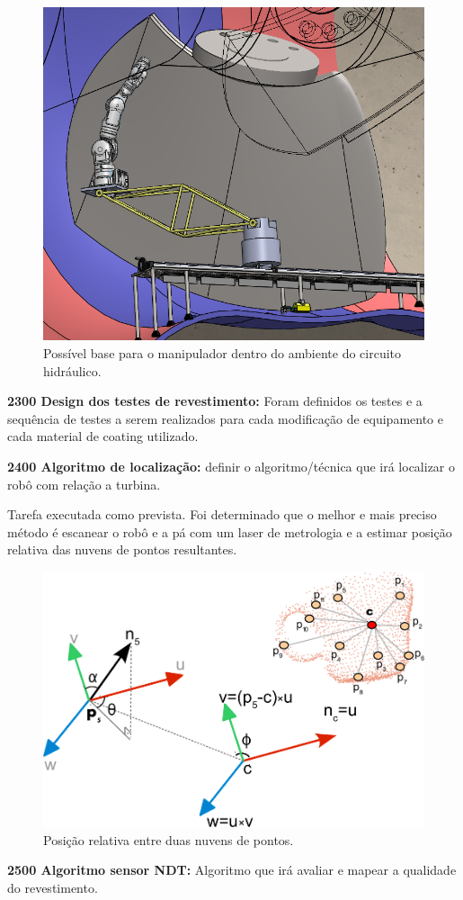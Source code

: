 \begin{figure}\centering
\includegraphics[width=0.6\columnwidth]{figs/EMMA_Base_Conceito_PRR}
\caption{Possível base para o manipulador dentro do ambiente do circuito
hidráulico.}
\end{figure} 


\noindent
\textbf{2300 Design dos testes de revestimento:} Foram definidos os testes e a
sequência de testes a serem realizados para cada modificação de equipamento e
cada material de coating utilizado.

\noindent
\textbf{2400 Algoritmo de localização:} definir o algoritmo/técnica que irá
localizar o robô com relação a turbina.

Tarefa executada como prevista. Foi determinado que o melhor e mais preciso
método é escanear o robô e a pá com um laser de metrologia e a estimar posição
relativa das nuvens de pontos resultantes.

\begin{figure}[H]
\centering
\includegraphics[width=0.6\columnwidth]{figs/pc_position}
\caption{Posição relativa entre duas nuvens de pontos.}
\end{figure} 

\noindent
\textbf{2500 Algoritmo sensor NDT:} Algoritmo que irá avaliar e mapear a
qualidade do revestimento.

